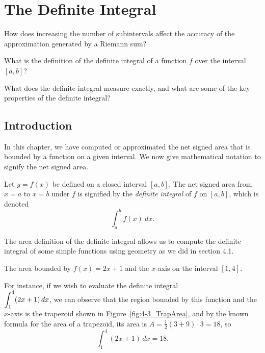 \section{The Definite Integral} \label{S:4.3.DefiniteIntegral}

\begin{goals}
\item How does increasing the number of subintervals affect the accuracy of the approximation generated by a Riemann sum?
\item What is the definition of the definite integral of a function $f$ over the interval $[a,b]$?
\item What does the definite integral measure exactly, and what are some of the key properties of the definite integral?
\end{goals}

\subsection*{Introduction}

In this chapter, we have computed or approximated the net signed area that is bounded by a function on a given interval. We now give mathematical notation to signify the net signed area.  

{Let $y=f(x)$ be defined on a closed interval $[a,b]$. The net signed area from $x=a$ to $x=b$ under $f$ is signified by the {\em definite integral} of $f$ on $[a,b]$, which is denoted 
\[ \int_a^b f(x)\ dx.\]
} %

The area definition of the definite integral allows us to compute the definite integral of some simple functions using geometry as we did in section 4.1.

\begin{marginfigure} %
\caption{The area bounded by $f(x)=2x+1$ and the $x$-axis on the interval $[1,4]$.} \label{fig:4-3_TrapArea}
\end{marginfigure}
  
For instance, if we wish to evaluate the definite integral \\$\displaystyle\int_1^4 (2x+1) \, dx$, we can observe that the region bounded by this function and the $x$-axis is the trapezoid shown in Figure~\ref{fig:4-3_TrapArea}, and by the known formula for the area of a trapezoid, its area is $A = \frac{1}{2}(3+9) \cdot 3 = 18$, so
\[ \int_1^4 (2x+1) \, dx = 18. \]

